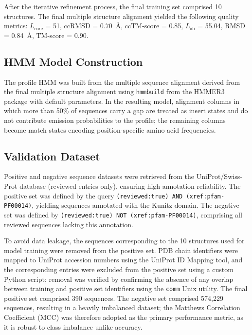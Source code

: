 \documentclass[11pt, a4paper]{article}
\begin{document}
After the iterative refinement process, the final training set 
comprised 10 structures. The final multiple structure alignment 
yielded the following quality metrics: $L_\text{core}$ = 51, 
ccRMSD = 0.70~\AA, ccTM-score = 0.85, $L_\text{ali}$ = 55.04, 
RMSD = 0.84~\AA, TM-score = 0.90.

\subsection{HMM Model Construction}

The profile HMM was built from the multiple sequence alignment 
derived from the final multiple structure alignment using 
\texttt{hmmbuild} from the HMMER3 package \cite{Eddy2011} with 
default parameters. In the resulting model, alignment columns 
in which more than 50\% of sequences carry a gap are treated as 
insert states and do not contribute emission probabilities to the 
profile; the remaining columns become match states encoding 
position-specific amino acid frequencies.

\subsection{Validation Dataset}

Positive and negative sequence datasets were retrieved from the 
UniProt/Swiss-Prot database \cite{UniProt2023} (reviewed entries 
only), ensuring high annotation reliability. The positive set 
was defined by the query \texttt{(reviewed:true) AND 
(xref:pfam-PF00014)}, yielding sequences annotated with the 
Kunitz domain. The negative set was defined by 
\texttt{(reviewed:true) NOT (xref:pfam-PF00014)}, comprising 
all reviewed sequences lacking this annotation.

To avoid data leakage, the sequences corresponding to the 10 
structures used for model training were removed from the positive 
set. PDB chain identifiers were mapped to UniProt accession 
numbers using the UniProt ID Mapping tool, and the corresponding 
entries were excluded from the positive set using a custom Python 
script; removal was verified by confirming the absence of any 
overlap between training and positive set identifiers using the 
\texttt{comm} Unix utility. The final positive set comprised 390 
sequences. The negative set comprised 574{,}229 sequences, 
resulting in a heavily imbalanced dataset; the Matthews 
Correlation Coefficient (MCC) was therefore adopted as the 
primary performance metric, as it is robust to class imbalance 
unlike accuracy.
\end{document}
